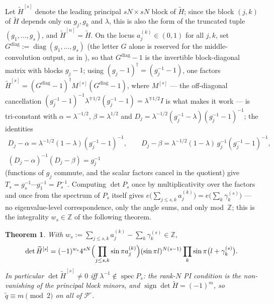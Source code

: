 \documentclass[11pt]{article}
\newtheorem{theorem}{Theorem}[section]
\theoremstyle{definition}
\newcommand{\Z}{\mathbb Z}
\newcommand{\Ht}{\widetilde H}
\begin{document}
Let $\Ht^{[s]}$ denote the leading principal $sN\times sN$ block of
$\Ht$; since the block $(j,k)$ of $\Ht$ depends only on $g_j,g_k$ and
$\lambda$, this is also the form of the truncated tuple
$(g_1,\dots,g_s)$, and $\Ht^{[n]}=\Ht$. On the locus
$a_j^{(k)}\in(0,1)$ for all $j,k$, set
$G^{\mathrm{diag}}:=\operatorname{diag}(g_1,\dots,g_s)$
(the letter $G$ alone is reserved for the middle-convolution output,
as in \cite{N-KLM}), so that $G^{\mathrm{diag}}-1$ is the invertible
block-diagonal matrix with blocks $g_j-1$; using
$(g_j-1)^{\dagger}=(g_j^{-1}-1)$, one factors
$\Ht^{[s]}=(G^{\mathrm{diag}}-1)^{\dagger}M^{[s]}(G^{\mathrm{diag}}-1)$,
where $M^{[s]}$ --- the off-diagonal
cancellation $(g_j^{-1}-1)^{-1}\lambda^{\mp1/2}(g_j^{-1}-1)
=\lambda^{\mp1/2}I$ is what makes it work --- is tri-constant with
$\alpha=\lambda^{-1/2}$, $\beta=\lambda^{1/2}$ and
$D_j=\lambda^{-1/2}(g_j^{-1}-\lambda)(g_j^{-1}-1)^{-1}$; the identities
\begin{equation}\label{eq:DalphaDbeta}
\begin{gathered}
D_j-\alpha=\lambda^{-1/2}(1-\lambda)(g_j^{-1}-1)^{-1},
\qquad
D_j-\beta=\lambda^{-1/2}(1-\lambda)\,g_j^{-1}(g_j^{-1}-1)^{-1},\\
(D_j-\alpha)^{-1}(D_j-\beta)=g_j^{-1}
\end{gathered}
\end{equation}
(functions of $g_j$ commute, and the scalar factors cancel in the
quotient) give $T_s=g_s^{-1}\cdots g_1^{-1}=P_s^{-1}$. Computing
$\det P_s$ once by multiplicativity over the factors and once from
the spectrum of $P_s$ itself gives
$e\bigl(\sum_{j\le s,k}a_j^{(k)}\bigr)=e\bigl(\sum_k\gamma^{(s)}_k
\bigr)$ --- no eigenvalue-level correspondence, only the angle sums,
and only mod~$\Z$; this is the integrality $w_s\in\Z$ of the
following theorem.

\begin{theorem}\label{thm:detN}
With $w_s:=\sum_{j\le s,k}a_j^{(k)}-\sum_k\gamma^{(s)}_k\in\Z$,
\[
\det\Ht^{[s]}
=(-1)^{w_s}4^{sN}
\Bigl(\prod_{j\le s,k}\sin\pi a_j^{(k)}\Bigr)(\sin\pi l)^{N(s-1)}
\prod_k\sin\pi\bigl(l+\gamma^{(s)}_k\bigr).
\]
In particular $\det\Ht^{[s]}\neq0$ iff
$\lambda^{-1}\notin\operatorname{spec}P_s$: the rank-$N$ PI condition is
the non-vanishing of the principal block minors, and
$\operatorname{sign}\det\Ht=(-1)^{m}$, so $\widetilde q\equiv m\pmod2$
on all of $\mathcal P^{\circ}$.
\end{theorem}
\end{document}
